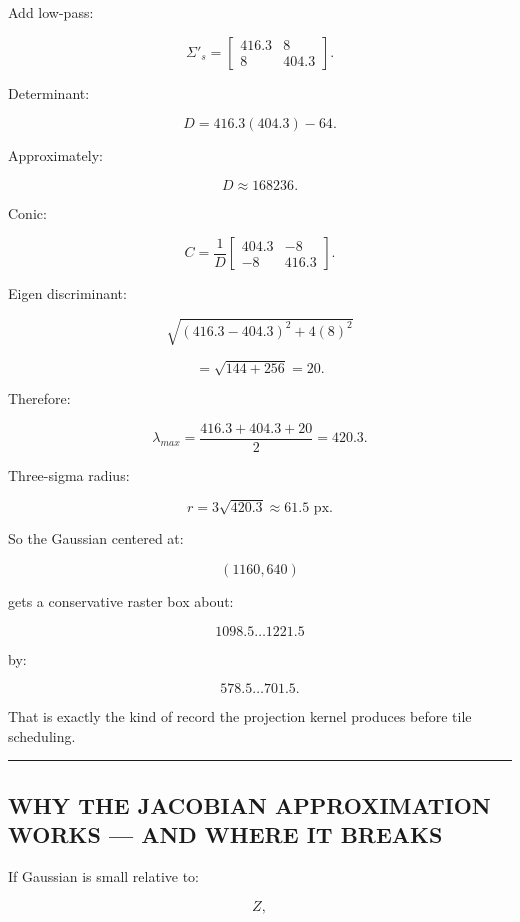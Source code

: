 Add low-pass:

\[
\Sigma'_s=
\begin{bmatrix}
416.3&8\\
8&404.3
\end{bmatrix}.
\]

Determinant:

\[
D=
416.3(404.3)-64.
\]

Approximately:

\[
D\approx168236.
\]

Conic:

\[
C=
\frac1D
\begin{bmatrix}
404.3&-8\\
-8&416.3
\end{bmatrix}.
\]

Eigen discriminant:

\[
\sqrt{
(416.3-404.3)^2
+
4(8)^2
}
\]

\[
=
\sqrt{
144+256
}
=
20.
\]

Therefore:

\[
\lambda_{max}
=
\frac{
416.3+404.3+20
}{2}
=
420.3.
\]

Three-sigma radius:

\[
r=
3\sqrt{420.3}
\approx61.5\text{ px}.
\]

So the Gaussian centered at:

\[
(1160,640)
\]

gets a conservative raster box about:

\[
1098.5\ldots1221.5
\]

by:

\[
578.5\ldots701.5.
\]

That is exactly the kind of record the projection kernel produces before tile scheduling.

\begin{center}\rule{0.5\linewidth}{0.5pt}\end{center}

\subsection{WHY THE JACOBIAN APPROXIMATION WORKS --- AND WHERE IT BREAKS}\label{04-visual-computing-ii-ch038-why-the-jacobian-approximation-works-and-where-it-breaks}

\hypertarget{04-visual-computing-ii-ch038-why-the-jacobian-approximation-works-and-where-it-breaks}{}

If Gaussian is small relative to:

\[
Z,
\]

